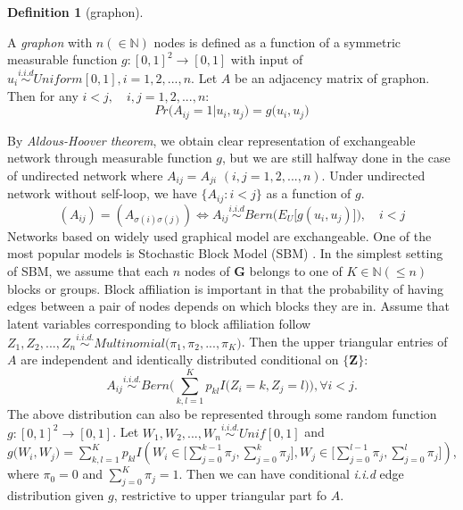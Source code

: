 \documentclass[12pt]{article}
\theoremstyle{definition}
\newtheorem{definition}{Definition}[section]
\begin{document}
\begin{definition}[graphon]
	\label{graphon}
		
	A \textit{graphon} with $n (\in \mathbb{N})$ nodes is defined as a function of a symmetric measurable function $g : [0,1]^2 \rightarrow [0,1]$ with input of $u_{i} \overset{i.i.d}{\sim} Uniform[0,1], i = 1,2,... ,n$. 
	Let $A$ be an adjacency matrix of graphon. Then for any $i < j, \quad i,j=1,2,...,n$:	
\begin{equation}
	Pr \big(   A_{ij} = 1 \big| u_{i}, u_{j} \big) = g \big(  u_{i}, u_{j} \big)
\end{equation}
\end{definition}
By \textit{Aldous-Hoover theorem}, we obtain clear representation of exchangeable network through measurable function $g$, but we are still halfway done in the case of undirected network where $A_{ij} = A_{ji}$  $(i,j=1,2,... , n)$.  Under undirected network without self-loop, we have $\{ A_{ij} : i < j \}$ as a function of $g$. 	
\begin{equation}
( A_{ij} )  =  (   A_{\sigma(i) \sigma(j)}  ) \Longleftrightarrow A_{ij} \overset{i.i.d}{\sim} Bern\big( E_{U} \big[  g(u_{i}, u_{j})   \big] \big),  \quad i < j
\end{equation}  	
Networks based on  widely used graphical model are exchangeable. One of the most popular models is Stochastic Block Model (SBM) \citep{holland1983stochastic}. In the simplest setting of SBM, we assume that each $n$ nodes of $\mathbf{G}$ belongs to one of $K \in \mathbb{N} (\leq n)$ blocks or groups. Block affiliation is important in that the probability of having edges between a pair of nodes depends on which blocks they are in.  Assume that latent variables corresponding to block affiliation follow $Z_{1}, Z_{2}, ... , Z_{n} \overset{i.i.d.}{\sim} Multinomial\big( \pi_{1}, \pi_{2}, ... , \pi_{K} \big)$. Then the upper triangular entries of $A$ are independent and identically distributed conditional on $\{\mathbf{Z}\}$:
	\begin{equation} 
	A_{ij} \overset{i.i.d.}{\sim} Bern\big( \sum\limits_{k,l=1}^{K} p_{kl} I\big( Z_{i} = k, Z_{j} = l  \big)    \big), \forall  i < j.
	\end{equation}
The above distribution can also be represented through some random function $g : [0,1]^2 \rightarrow [0,1]$. Let $W_{1}, W_{2}, ... , W_{n} \overset{i.i.d.}{\sim} Unif[0,1]$ and $g\big( W_{i}, W_{j} \big) = \sum\limits_{k,l=1}^{K} p_{kl} I \left( W_{i} \in \big[ \sum\limits_{j=0}^{k-1} \pi_{j}, \sum\limits_{j=0}^{k} \pi_{j}   \big] , W_{j} \in \big[ \sum\limits_{j=0}^{l-1} \pi_{j}, \sum\limits_{j=0}^{l} \pi_{j}  \big]  \right)$, where $\pi_{0} = 0$ and $\sum\limits_{j=0}^{K}  \pi_{j} = 1$. Then we can have conditional \textit{i.i.d} edge distribution given $g$, restrictive to upper triangular part fo $A$.
\end{document}
